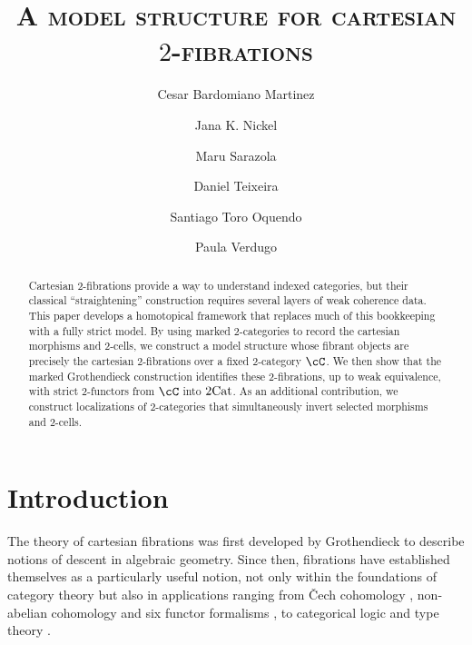 \documentclass[11pt, dvipsnames]{amsart}
\title{\textsc{A model structure for cartesian \texorpdfstring{$2$}{2}-fibrations}}
\author[C. Bardomiano]{Cesar Bardomiano Martinez}
\author[J. K. Nickel]{Jana K. Nickel}
\author[M. Sarazola]{Maru Sarazola}
\author[D. Teixeira]{Daniel Teixeira}
\author[S. Toro]{Santiago Toro Oquendo}
\author[P. Verdugo]{Paula Verdugo}
\begin{document}

\begin{abstract} 
  Cartesian 2-fibrations provide a way to understand indexed categories, but their classical ``straightening'' construction requires several layers of weak coherence data. This paper develops a homotopical framework that replaces much of this bookkeeping with a fully strict model. By using marked 2-categories to record the  cartesian morphisms and 2-cells, we construct a model structure whose fibrant objects are precisely the cartesian 2-fibrations over a fixed 2-category $\cC$. We then show that the marked Grothendieck construction identifies these 2-fibrations, up to weak equivalence, with strict 2-functors from $\cC$ into $2\mathrm{Cat}$. 
  As an additional contribution, we construct localizations of 2-categories that simultaneously invert selected morphisms and 2-cells.
\end{abstract}


\maketitle




\setcounter{tocdepth}{1}
\tableofcontents





\section{Introduction}
The theory of cartesian fibrations was first developed by Grothendieck \cite{grothendieckdescent} to describe notions of descent in algebraic geometry. Since then, fibrations have established themselves as a particularly useful notion, not only within the foundations of category theory \cite{street1, street2, benabou} but also in applications ranging from \v{C}ech cohomology \cite{graydescent}, non-abelian cohomology \cite{giraud1,giraud2} and six functor formalisms \cite{Cisinski-Deglise2019}, to categorical logic \cite{catlogic1,lawverelogic,catlogic2} and type theory \cite{typetheory}. 
\end{document}
